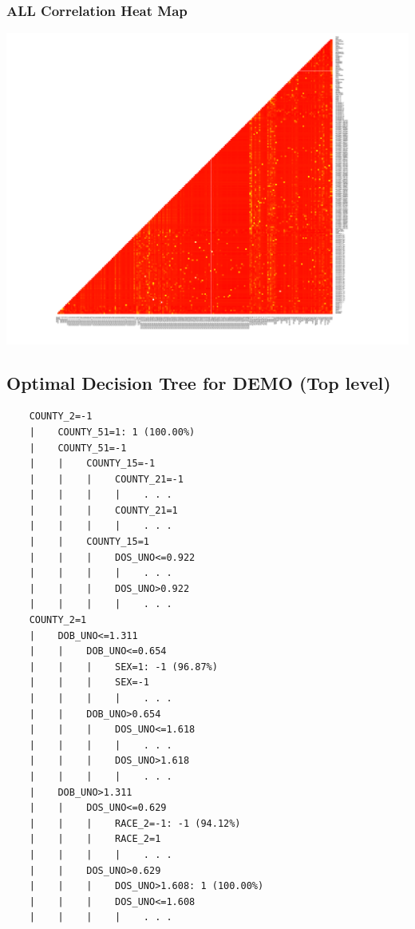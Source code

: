 \documentclass[11pt,letter]{article}
\begin{document}
\subsubsection{ALL Correlation Heat Map}
\includegraphics[scale=0.5]{report_figures/all.pdf}

\subsection{Optimal Decision Tree for DEMO (Top level)} %
\begin{verbatim}
	COUNTY_2=-1
	|    COUNTY_51=1: 1 (100.00%)
	|    COUNTY_51=-1
	|    |    COUNTY_15=-1
	|    |    |    COUNTY_21=-1
	|    |    |    |    . . .
	|    |    |    COUNTY_21=1
	|    |    |    |    . . .
	|    |    COUNTY_15=1
	|    |    |    DOS_UNO<=0.922
	|    |    |    |    . . .
	|    |    |    DOS_UNO>0.922
	|    |    |    |    . . .
	COUNTY_2=1
	|    DOB_UNO<=1.311
	|    |    DOB_UNO<=0.654
	|    |    |    SEX=1: -1 (96.87%)
	|    |    |    SEX=-1
	|    |    |    |    . . .
	|    |    DOB_UNO>0.654
	|    |    |    DOS_UNO<=1.618
	|    |    |    |    . . .
	|    |    |    DOS_UNO>1.618
	|    |    |    |    . . .
	|    DOB_UNO>1.311
	|    |    DOS_UNO<=0.629
	|    |    |    RACE_2=-1: -1 (94.12%)
	|    |    |    RACE_2=1
	|    |    |    |    . . .
	|    |    DOS_UNO>0.629
	|    |    |    DOS_UNO>1.608: 1 (100.00%)
	|    |    |    DOS_UNO<=1.608
	|    |    |    |    . . .
\end{verbatim}
\end{document}
